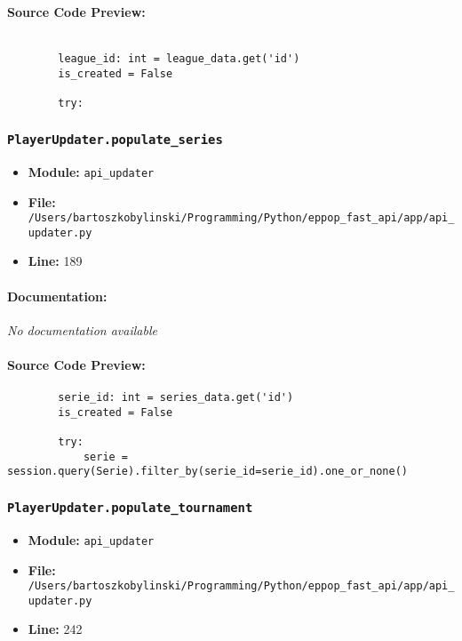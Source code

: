 \documentclass[11pt,a4paper]{article}
\begin{document}
\paragraph{Source Code Preview:}
\begin{verbatim}

        league_id: int = league_data.get('id')
        is_created = False

        try:
\end{verbatim}

\vspace{1em}
\subsubsection{\texttt{PlayerUpdater.populate\_series}}

\begin{itemize}
    \item \textbf{Module:} \texttt{api\_updater}
    \item \textbf{File:} \texttt{/Users/bartoszkobylinski/Programming/Python/eppop\_fast\_api/app/api\_updater.py}
    \item \textbf{Line:} 189
\end{itemize}

\paragraph{Documentation:} \textit{No documentation available}

\paragraph{Source Code Preview:}
\begin{verbatim}
        serie_id: int = series_data.get('id')
        is_created = False

        try:
            serie = session.query(Serie).filter_by(serie_id=serie_id).one_or_none()
\end{verbatim}

\vspace{1em}
\subsubsection{\texttt{PlayerUpdater.populate\_tournament}}

\begin{itemize}
    \item \textbf{Module:} \texttt{api\_updater}
    \item \textbf{File:} \texttt{/Users/bartoszkobylinski/Programming/Python/eppop\_fast\_api/app/api\_updater.py}
    \item \textbf{Line:} 242
\end{itemize}
\end{document}
